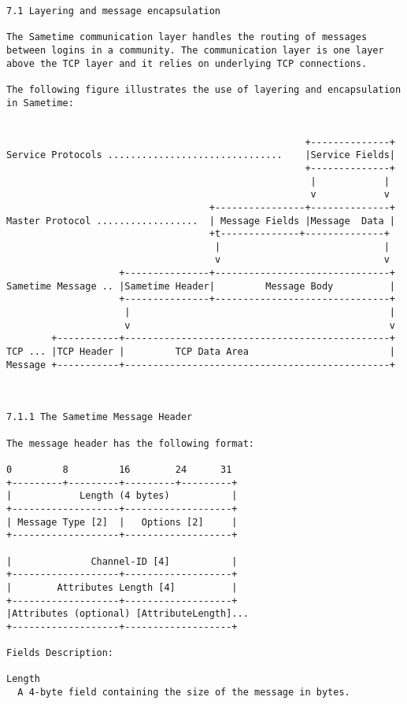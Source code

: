 \documentclass[titlepage,oneside]{book}
\begin{document}
\begin{verbatim}
7.1 Layering and message encapsulation

The Sametime communication layer handles the routing of messages
between logins in a community. The communication layer is one layer
above the TCP layer and it relies on underlying TCP connections.

The following figure illustrates the use of layering and encapsulation
in Sametime:


                                                     +--------------+
Service Protocols ...............................    |Service Fields|
                                                     +--------------+
                                                      |            |
                                                      v            v
                                    +----------------+--------------+
Master Protocol ..................  | Message Fields |Message  Data |
                                    +t--------------+--------------+
                                     |                             |
                                     v                             v
                    +---------------+-------------------------------+
Sametime Message .. |Sametime Header|         Message Body          |
                    +---------------+-------------------------------+
                     |                                              |
                     v                                              v
        +-----------+-----------------------------------------------+
TCP ... |TCP Header |         TCP Data Area                         |
Message +-----------+-----------------------------------------------+



7.1.1 The Sametime Message Header

The message header has the following format:

0         8         16        24      31
+---------+---------+---------+---------+
|            Length (4 bytes)           |
+-------------------+-------------------+
| Message Type [2]  |   Options [2]     |
+-------------------+-------------------+

|              Channel-ID [4]           |
+-------------------+-------------------+
|        Attributes Length [4]          |
+-------------------+-------------------+
|Attributes (optional) [AttributeLength]...
+-------------------+-------------------+

Fields Description:

Length
  A 4-byte field containing the size of the message in bytes.


\end{verbatim}
\end{document}
